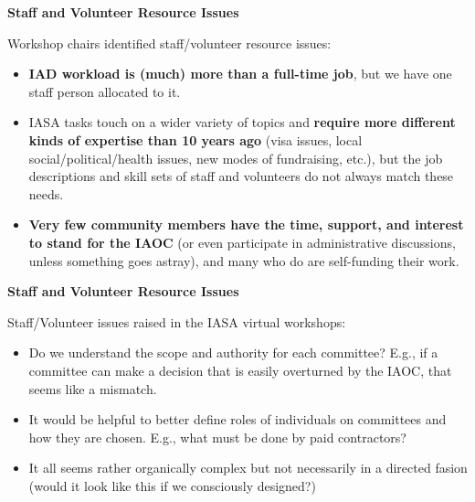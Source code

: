 \documentclass[helvetica]{seminar}
\newcommand{\heading}[1]{%
  \begin{center} 
    \large\bf 
    #1 
  \end{center} 
  \vspace{.4 in}}
\begin{document}
\begin{slide}
\heading{Staff and Volunteer Resource Issues}

Workshop chairs identified staff/volunteer resource issues:
{\footnotesize
\begin{itemize}
\item \textbf{IAD workload is (much) more than a full-time job}, but
  we have one staff person allocated to it.
\item IASA tasks touch on a wider variety of topics and
  \textbf{require more different kinds of expertise than 10 years ago}
  (visa issues, local social/political/health issues, new modes of
  fundraising, etc.), but the job descriptions and skill sets of staff
  and volunteers do not always match these needs.
\item \textbf{Very few community members have the time, support, and
  interest to stand for the IAOC} (or even participate in
  administrative discussions, unless something goes astray), and many
  who do are self-funding their work.
\end{itemize}
}

\end{slide}

\begin{slide}
\heading{Staff and Volunteer Resource Issues}

Staff/Volunteer issues raised in the IASA virtual workshops:
\begin{itemize}
\item Do we understand the scope and authority for each committee?
  E.g., if a committee can make a decision that is easily overturned
  by the IAOC, that seems like a mismatch.
\item It would be helpful to better define roles of individuals on
  committees and how they are chosen. E.g., what must be done by paid
  contractors?
\item It all seems rather organically complex but not necessarily in a
  directed fasion (would it look like this if we consciously
  designed?)
\end{itemize}

\end{slide}
\end{document}
